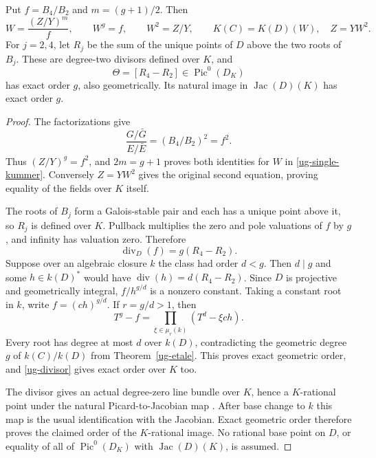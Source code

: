 \begin{theorem}
\label{ug-exact-torsion}
Put $f=B_4/B_2$ and $m=(g+1)/2$. Then
\begin{equation}\label{ug-single-kummer}
 W=\frac{(Z/Y)^m}{f},\qquad W^g=f,\qquad W^2=Z/Y,\qquad
 K(C)=K(D)(W),\quad Z=YW^2.
\end{equation}
For $j=2,4$, let $R_j$ be the sum of the unique points of $D$
above the two roots of $B_j$. These are degree-two divisors
defined over $K$, and
\[
 \Theta=[R_4-R_2]\in\operatorname{Pic}^0(D_K)
\]
has exact order $g$, also geometrically. Its natural image in
$\operatorname{Jac}(D)(K)$ has exact order $g$.
\end{theorem}
\begin{proof}
The factorizations give
\[
 \frac{G/\bar G}{E/\bar E}=(B_4/B_2)^2=f^2.
\]
Thus $(Z/Y)^g=f^2$, and $2m=g+1$ proves both identities for $W$
in \eqref{ug-single-kummer}. Conversely $Z=YW^2$ gives the original
second equation, proving equality of the fields over $K$ itself.

The roots of $B_j$ form a Galois-stable pair and each has a unique
point above it, so $R_j$ is defined over $K$. Pullback multiplies
the zero and pole valuations of $f$ by $g$, and infinity has
valuation zero. Therefore
\begin{equation}\label{ug-divisor}
 \operatorname{div}_D(f)=g(R_4-R_2).
\end{equation}
Suppose over an algebraic closure $k$ the class had order $d<g$.
Then $d\mid g$ and some $h\in k(D)^*$ would have
$\operatorname{div}(h)=d(R_4-R_2)$. Since $D$ is projective and
geometrically integral, $f/h^{g/d}$ is a nonzero constant.
Taking a constant root in $k$, write $f=(ch)^{g/d}$.
If $r=g/d>1$, then
\[
 T^g-f=\prod_{\xi\in\mu_r(k)}(T^d-\xi ch).
\]
Every root has degree at most $d$ over $k(D)$, contradicting the
geometric degree $g$ of $k(C)/k(D)$ from Theorem~\ref{ug-etale}.
This proves exact geometric order, and \eqref{ug-divisor} gives
exact order over $K$ too.

The divisor gives an actual degree-zero line bundle over $K$,
hence a $K$-rational point under the natural Picard-to-Jacobian
map \cite[Theorem~1.1 and Remark~1.5]{MilneJV2021}.
After base change to $k$ this map is the usual identification
with the Jacobian. Exact geometric order therefore proves the
claimed order of the $K$-rational image. No rational base point
on $D$, or equality of all of
$\operatorname{Pic}^0(D_K)$ with $\operatorname{Jac}(D)(K)$,
is assumed.
\end{proof}

